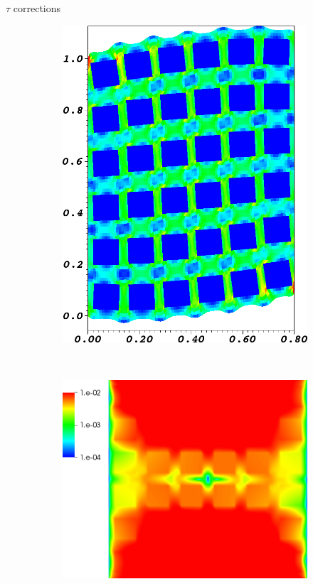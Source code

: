 \documentclass{beamer}
\begin{document}
\begin{frame}{$\tau$ corrections}
\begin{figure}
\begin{subfigure}[b]{0.18\textwidth}
    \includegraphics[width=\textwidth]{figures/MG/ElasticityCompressShearTrim}
  \end{subfigure} ~
  \begin{subfigure}[b]{0.28\textwidth}
    \includegraphics[width=\textwidth]{figures/MG/ElasticityCompressErrorNoTauTrim}

\end{subfigure}
\end{figure}
\end{frame}
\end{document}
